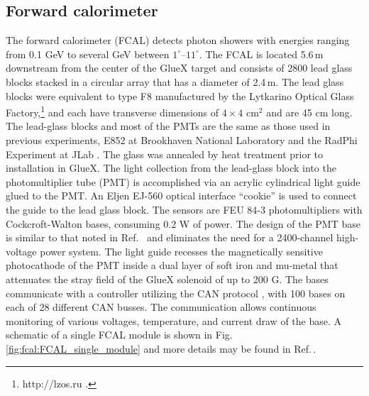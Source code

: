 \subsection{Forward calorimeter \label{sec:fcal}}
The forward calorimeter (FCAL) detects photon showers with energies ranging from 0.1 GeV to several GeV between $1^{\circ}$--$11^{\circ}$. The FCAL is located 5.6\,m downstream from the center of the GlueX target and consists of 2800 lead glass blocks stacked in a circular array that has a diameter of 2.4\,m.  The lead glass blocks were equivalent to type F8 manufactured by the Lytkarino Optical Glass Factory,\footnote{http://lzos.ru .} and each have transverse dimensions of $4\times4$ cm$^2$ and are 45 cm long. The lead-glass blocks and most of the PMTs are the same as those used in previous experiments, E852 at Brookhaven National Laboratory 
\cite{CRITTENDEN1997377} and the RadPhi Experiment at JLab \cite{JONES2007384}. The glass was annealed by heat treatment prior to installation in GlueX. 
The light collection from the lead-glass block into the photomultiplier tube (PMT) is accomplished via an acrylic cylindrical light guide glued to the PMT. An Eljen EJ-560 optical interface ``cookie'' is used to connect the guide to the lead glass block. 
The sensors are FEU 84-3 photomultipliers with Cockcroft-Walton bases, consuming 0.2 W of power.  The design of the PMT base is similar to that noted in Ref.~\cite{BRUNNER1998466}
and eliminates the need for a 2400-channel high-voltage power system. The light guide recesses the magnetically sensitive photocathode of the PMT inside a dual layer of soft iron and mu-metal that attenuates the stray field of the GlueX solenoid of up to 200 G. The bases communicate with a controller utilizing the CAN protocol \cite{}, with 100 bases on each of 28 different CAN busses.  The communication allows continuous monitoring of various voltages, temperature, and current draw of the base.
A schematic of a single FCAL module is shown in 
Fig.\,\ref{fig:fcal:FCAL_single_module} and more details may be found in Ref.\,\cite{MORIYA201360}.

